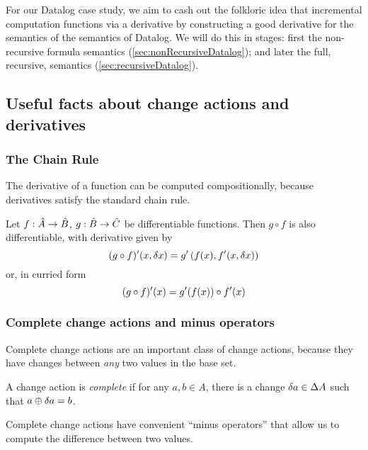 For our Datalog case study, we aim to cash out the folkloric idea that
incremental computation functions via a derivative by constructing a good derivative for the semantics of
the semantics of Datalog. We will do this in stages: first the non-recursive
formula semantics (\cref{sec:nonRecursiveDatalog}); and later the full, recursive, semantics 
(\cref{sec:recursiveDatalog}).

\subsection{Useful facts about change actions and derivatives}

\subsubsection{The Chain Rule}

The derivative of a function can be computed compositionally, because derivatives satisfy the standard chain rule.

\begin{thm}
  Let $f: \hat{A} \rightarrow \hat{B}$, $g: \hat{B} \rightarrow \hat{C}$ be differentiable functions. Then $g \circ f$ is also
  differentiable, with derivative given by
  \begin{displaymath}
    (g \circ f)'(x, \delta x) = g'\left(f(x), f'(x, \delta x)\right)
  \end{displaymath}
  or, in curried form
  \begin{displaymath}
    (g \circ f)'(x) = g'(f(x)) \circ f'(x)
  \end{displaymath}
\end{thm}

\subsubsection{Complete change actions and minus operators}

Complete change actions are an important class of change actions, because they
have changes between \emph{any} two values in the base set.

\begin{defn}
  A change action is \emph{complete} if for any $a, b \in A$, there is
  a change $\delta a \in \Delta A$ such that $a \oplus \delta a = b$.
\end{defn}

Complete change actions have convenient ``minus operators'' that allow us to
compute the difference between two values.

